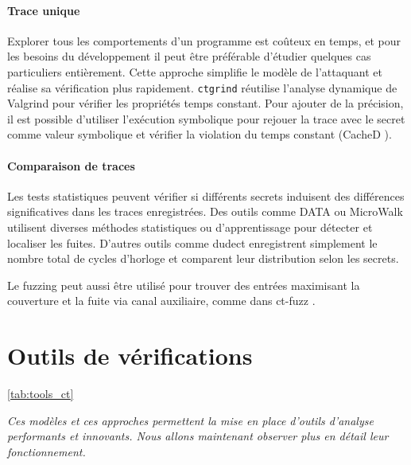 \paragraph{Trace unique} Explorer tous les comportements d'un programme est coûteux en temps, et pour les besoins du développement il peut être préférable d'étudier quelques cas particuliers entièrement. Cette approche simplifie le modèle de l'attaquant et réalise sa vérification plus rapidement. \texttt{ctgrind} \cite{ctgrind} réutilise l'analyse dynamique de Valgrind pour vérifier les propriétés temps constant. Pour ajouter de la précision, il est possible d'utiliser l'exécution symbolique pour rejouer la trace avec le secret comme valeur symbolique et vérifier la violation du temps constant (CacheD \cite{CacheD}).

\paragraph{Comparaison de traces} Les tests statistiques peuvent vérifier si différents secrets induisent des différences significatives dans les traces enregistrées. Des outils comme DATA \cite{DATA1} ou MicroWalk \cite{MicroWalk} utilisent diverses méthodes statistiques ou d'apprentissage pour détecter et localiser les fuites. D'autres outils comme dudect \cite{dudect} enregistrent simplement le nombre total de cycles d'horloge et comparent leur distribution selon les secrets.

Le fuzzing peut aussi être utilisé pour trouver des entrées maximisant la couverture et la fuite via canal auxiliaire, comme dans ct-fuzz \cite{ctfuzz}.\medbreak


\section{Outils de vérifications}

\ref{tab:tools_ct}

\textit{Ces modèles et ces approches permettent la mise en place d'outils d'analyse performants et innovants. Nous allons maintenant observer plus en détail leur fonctionnement.}

